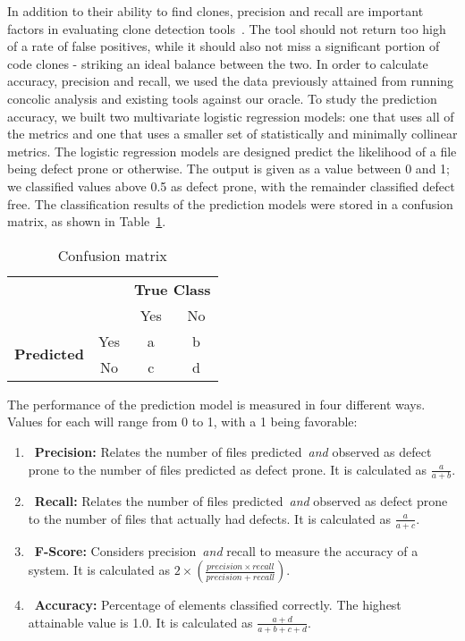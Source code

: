 \documentclass[smallextended]{svjour3}       %
\begin{document}
In addition to their ability to find clones, precision and recall are important factors in evaluating clone detection tools~\cite{Zibran:2012:IRF:2231936.2231970}. The tool should not return too high of a rate of false positives, while it should also not miss a significant portion of code clones - striking an ideal balance between the two. In order to calculate accuracy, precision and recall, we used the data previously attained from running concolic analysis and existing tools against our oracle. To study the prediction accuracy, we built two multivariate logistic regression models: one that uses all of the metrics and one that uses a smaller set of statistically and minimally collinear metrics. The logistic regression models are designed predict the likelihood of a file being defect prone or otherwise. The output is given as a value between 0 and 1; we classified values above 0.5 as defect prone, with the remainder classified defect free. The classification results of the prediction models were stored in a confusion matrix, as shown in Table~\ref{Table:conf_matrix}.
\begin{table}[h!]
  \centering
\caption{Confusion matrix}
\label{Table:conf_matrix}
  \begin{tabular}{cc|cc}
    & &\multicolumn{2}{c}{\textbf{True  Class}} \\
    \cmidrule(rl){3-4}
    & & Yes & No \\
    \hline
    \multirow{2}{*}{\textbf{Predicted}}
    & Yes & a & b \\
    & No & c & d \\
    \hline
  \end{tabular}

\end{table}


The performance of the prediction model is measured in four different ways. Values for each will range from 0 to 1, with a 1 being favorable:
\begin{enumerate}
  \item~\textbf{Precision:} Relates the number of files predicted~\emph{and} observed as defect prone to the number of files predicted as defect prone. It is calculated as $\frac{a}{a+b}$.

  \item~\textbf{Recall:} Relates the number of files predicted~\emph{and} observed as defect prone to the number of files that actually had defects. It is calculated as $\frac{a}{a+c}$.

  \item~\textbf{F-Score:} Considers precision~\emph{and} recall to measure the accuracy of a system. It is calculated as $2\times(\frac{precision\times recall}{precision+recall})$.

 \item~\textbf{Accuracy:} Percentage of elements classified correctly. The highest attainable value is 1.0. It is calculated as $\frac{a+d}{a+b+c+d}$.

\end{enumerate}
\end{document}
